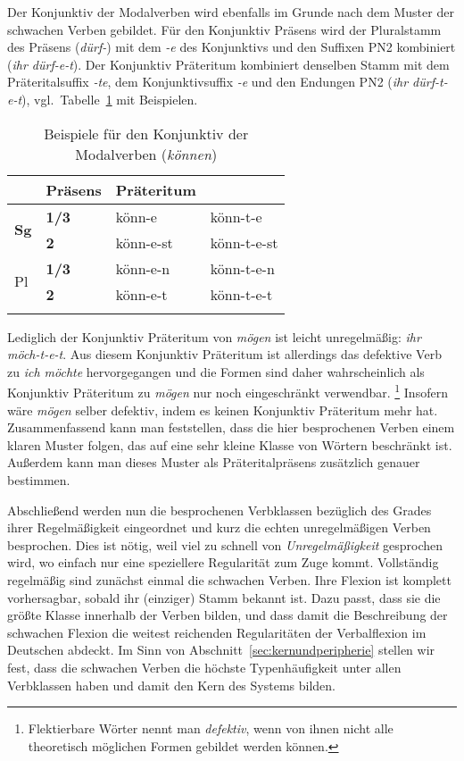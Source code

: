 Der Konjunktiv der Modalverben wird ebenfalls im Grunde nach dem Muster der schwachen Verben gebildet.
Für den Konjunktiv Präsens wird der Pluralstamm des Präsens (\textit{dürf-}) mit dem \textit{-e} des Konjunktivs und den Suffixen PN2 kombiniert (\textit{ihr dürf-e-t}).
Der Konjunktiv Präteritum kombiniert denselben Stamm mit dem Präteritalsuffix \textit{-te}, dem Konjunktivsuffix \textit{-e} und den Endungen PN2 (\textit{ihr dürf-t-e-t}), vgl.\ Tabelle~\ref{tab:kleineverbklassen122} mit Beispielen.

\begin{table}[!htbp]
  \centering
  \begin{tabular}{llll}
    \lsptoprule
    \multicolumn{2}{c}{} & \textbf{Präsens} & \textbf{Präteritum} \\
    \midrule
    \multirow{2}{*}{\textbf{Sg}} & \textbf{1/3} & könn-e & könn-t-e \\
    & \textbf{2} & könn-e-st & könn-t-e-st \\
    \midrule
    \multirow{2}{*}{Pl} & \textbf{1/3} & könn-e-n & könn-t-e-n \\
    & \textbf{2} & könn-e-t & könn-t-e-t \\
    \lspbottomrule
  \end{tabular}
  \caption{Beispiele für den Konjunktiv der Modalverben (\textit{können})}
  \label{tab:kleineverbklassen122}
\end{table}

Lediglich der Konjunktiv Präteritum von \textit{mögen} ist leicht unregelmäßig: \textit{ihr möch-t-e-t}.
Aus diesem Konjunktiv Präteritum ist allerdings das defektive Verb zu \textit{ich möchte} hervorgegangen und die Formen sind daher wahrscheinlich als Konjunktiv Präteritum zu \textit{mögen} nur noch eingeschränkt verwendbar.%
\footnote{Flektierbare Wörter nennt man \textit{defektiv}, wenn von ihnen nicht alle theoretisch möglichen Formen gebildet werden können.}
Insofern wäre \textit{mögen} selber defektiv, indem es keinen Konjunktiv Präteritum mehr hat.
Zusammenfassend kann man feststellen, dass die hier besprochenen Verben einem klaren Muster folgen, das auf eine sehr kleine Klasse von Wörtern beschränkt ist.
Außerdem kann man dieses Muster als Präteritalpräsens zusätzlich genauer bestimmen.


Abschließend werden nun die besprochenen Verbklassen bezüglich des Grades ihrer Regelmäßigkeit eingeordnet und kurz die echten unregelmäßigen Verben besprochen.
Dies ist nötig, weil viel zu schnell von \textit{Unregelmäßigkeit} gesprochen wird, wo einfach nur eine speziellere Regularität zum Zuge kommt.
Vollständig regelmäßig sind zunächst einmal die schwachen Verben.
Ihre Flexion ist komplett vorhersagbar, sobald ihr (einziger) Stamm bekannt ist.
Dazu passt, dass sie die größte Klasse innerhalb der Verben bilden, und dass damit die Beschreibung der schwachen Flexion die weitest reichenden Regularitäten der Verbalflexion im Deutschen abdeckt.
Im Sinn von Abschnitt~\ref{sec:kernundperipherie} stellen wir fest, dass die schwachen Verben die höchste Typenhäufigkeit unter allen Verbklassen haben und damit den Kern des Systems bilden.

